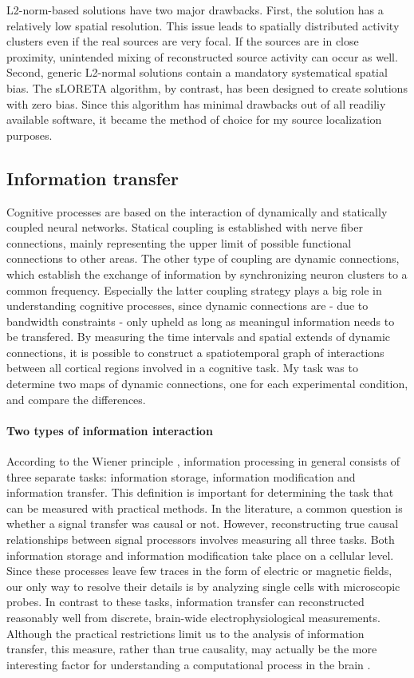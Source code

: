L2-norm-based solutions have two major drawbacks.
First, the solution has a relatively low spatial resolution.
This issue leads to spatially distributed activity clusters even if the real sources are very focal.
If the sources are in close proximity, unintended mixing of reconstructed source activity can occur as well.
Second, generic L2-normal solutions contain a mandatory systematical spatial bias.
The sLORETA algorithm, by contrast, has been designed to create solutions with zero bias.
Since this algorithm has minimal drawbacks out of all readiliy available software, it became the method of choice for my source localization purposes.

\subsection{Information transfer}
Cognitive processes are based on the interaction of dynamically and statically coupled neural networks.
Statical coupling is established with nerve fiber connections, mainly representing the upper limit of possible functional connections to other areas.
The other type of coupling are dynamic connections, which establish the exchange of information by synchronizing neuron clusters to a common frequency.
Especially the latter coupling strategy plays a big role in understanding cognitive processes, since dynamic connections are - due to bandwidth constraints - only upheld as long as meaningul information needs to be transfered.
By measuring the time intervals and spatial extends of dynamic connections, it is possible to construct a spatiotemporal graph of interactions between all cortical regions involved in a cognitive task.
My task was to determine two maps of dynamic connections, one for each experimental condition, and compare the differences.

\paragraph{Two types of information interaction}
According to the Wiener principle \cite{1.5.information}, information processing in general consists of three separate tasks: information storage, information modification and information transfer.
This definition is important for determining the task that can be measured with practical methods.
In the literature, a common question is whether a signal transfer was causal or not.
However, reconstructing true causal relationships between signal processors involves measuring all three tasks.
Both information storage and information modification take place on a cellular level.
Since these processes leave few traces in the form of electric or magnetic fields, our only way to resolve their details is by analyzing single cells with microscopic probes.
In contrast to these tasks, information transfer can reconstructed reasonably well from discrete, brain-wide electrophysiological measurements.
Although the practical restrictions limit us to the analysis of information transfer, this measure, rather than true causality, may actually be the more interesting factor for understanding a computational process in the brain \cite{1.5.causality}.

